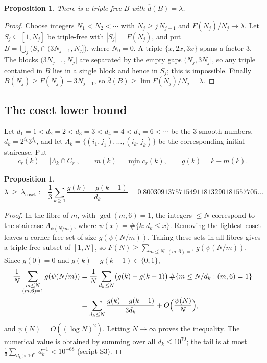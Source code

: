 \documentclass[11pt]{amsart}
\newtheorem{proposition}[theorem]{Proposition}
\theoremstyle{definition}
\newcommand{\dup}{\overline{d}}
\newcommand{\lamc}{\lambda_{\mathrm{coset}}}
\begin{document}
\begin{proposition}\label{prop:block}
There is a triple-free $B$ with $\dup(B)=\lambda$.
\end{proposition}

\begin{proof}
Choose integers $N_1<N_2<\cdots$ with $N_{j}\ge j\,N_{j-1}$ and $F(N_j)/N_j\to\lambda$. Let $S_j\subseteq[1,N_j]$ be triple-free with $|S_j|=F(N_j)$, and put $B=\bigcup_j\bigl(S_j\cap(3N_{j-1},N_j]\bigr)$, where $N_0=0$. A triple $\{x,2x,3x\}$ spans a factor $3$. The blocks $(3N_{j-1},N_j]$ are separated by the empty gaps $(N_j,3N_j]$, so any triple contained in $B$ lies in a single block and hence in $S_j$; this is impossible. Finally $B(N_j)\ge F(N_j)-3N_{j-1}$, so $\dup(B)\ge\lim F(N_j)/N_j=\lambda$.
\end{proof}

\subsection{The coset lower bound}\label{subsec:coset}
Let $d_1=1<d_2=2<d_3=3<d_4=4<d_5=6<\cdots$ be the $3$-smooth numbers, $d_k=2^{i_k}3^{j_k}$, and let $\Lambda_k=\{(i_1,j_1),\dots,(i_k,j_k)\}$ be the corresponding initial staircase. Put
\[
c_r(k)=|\Lambda_k\cap C_r|,\qquad m(k)=\min_r c_r(k),\qquad g(k)=k-m(k).
\]

\begin{proposition}\label{prop:cosetlower}
\[
\lambda\ \ge\ \lamc:=\frac13\sum_{k\ge1}\frac{g(k)-g(k-1)}{d_k}=0.80030913757154911813290181557705\ldots
\]
\end{proposition}

\begin{proof}
In the fibre of $m$, with $\gcd(m,6)=1$, the integers $\le N$ correspond to the staircase $\Lambda_{\psi(N/m)}$, where $\psi(x)=\#\{k:d_k\le x\}$. Removing the lightest coset leaves a corner-free set of size $g(\psi(N/m))$. Taking these sets in all fibres gives a triple-free subset of $[1,N]$, so $F(N)\ge\sum_{m\le N,\,(m,6)=1}g(\psi(N/m))$. Since $g(0)=0$ and $g(k)-g(k-1)\in\{0,1\}$,
\begin{align*}
\frac1N\sum_{\substack{m\le N\\(m,6)=1}}g(\psi(N/m))&=\frac1N\sum_{d_k\le N}\bigl(g(k)-g(k-1)\bigr)\,\#\{m\le N/d_k:(m,6)=1\}\\
&=\sum_{d_k\le N}\frac{g(k)-g(k-1)}{3d_k}+O\Bigl(\frac{\psi(N)}N\Bigr),
\end{align*}
and $\psi(N)=O((\log N)^2)$. Letting $N\to\infty$ proves the inequality. The numerical value is obtained by summing over all $d_k\le10^{70}$; the tail is at most $\frac13\sum_{d_k>10^{70}}d_k^{-1}<10^{-68}$ (script S3).
\end{proof}
\end{document}

